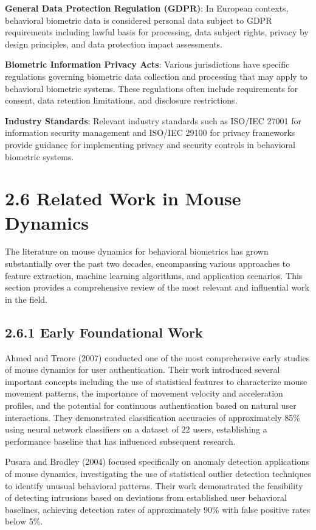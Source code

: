 \documentclass[
  12pt,
  a4paper,
]{report}
\begin{document}
\textbf{General Data Protection Regulation (GDPR)}: In European
contexts, behavioral biometric data is considered personal data subject
to GDPR requirements including lawful basis for processing, data subject
rights, privacy by design principles, and data protection impact
assessments.

\textbf{Biometric Information Privacy Acts}: Various jurisdictions have
specific regulations governing biometric data collection and processing
that may apply to behavioral biometric systems. These regulations often
include requirements for consent, data retention limitations, and
disclosure restrictions.

\textbf{Industry Standards}: Relevant industry standards such as ISO/IEC
27001 for information security management and ISO/IEC 29100 for privacy
frameworks provide guidance for implementing privacy and security
controls in behavioral biometric systems.

\section{2.6 Related Work in Mouse
Dynamics}\label{related-work-in-mouse-dynamics}

The literature on mouse dynamics for behavioral biometrics has grown
substantially over the past two decades, encompassing various approaches
to feature extraction, machine learning algorithms, and application
scenarios. This section provides a comprehensive review of the most
relevant and influential work in the field.

\subsection{2.6.1 Early Foundational
Work}\label{early-foundational-work}

Ahmed and Traore (2007) conducted one of the most comprehensive early
studies of mouse dynamics for user authentication. Their work introduced
several important concepts including the use of statistical features to
characterize mouse movement patterns, the importance of movement
velocity and acceleration profiles, and the potential for continuous
authentication based on natural user interactions. They demonstrated
classification accuracies of approximately 85\% using neural network
classifiers on a dataset of 22 users, establishing a performance
baseline that has influenced subsequent research.

Pusara and Brodley (2004) focused specifically on anomaly detection
applications of mouse dynamics, investigating the use of statistical
outlier detection techniques to identify unusual behavioral patterns.
Their work demonstrated the feasibility of detecting intrusions based on
deviations from established user behavioral baselines, achieving
detection rates of approximately 90\% with false positive rates below
5\%.
\end{document}
